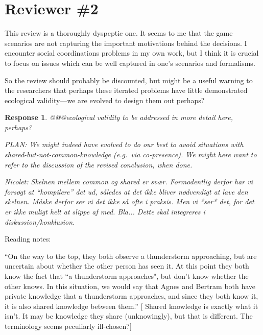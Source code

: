 \documentclass[a4paper]{article}
\newtheorem{response}{Response}
\newenvironment{robin}{\smallskip \noindent \color{red!10!green!50!blue}}{\color{black}\smallskip}
\begin{document}
\section*{Reviewer \#2}
This review is a thoroughly dyspeptic one. It seems to me that the game scenarios are not capturing the important motivations behind the decisions. I encounter social coordinations problems in my own work, but I think it is crucial to focus on issues which can be well captured in one's scenarios and formalisms.

So the review should probably be discounted, but might be a useful warning to the researchers that perhaps these iterated problems have little demonstrated ecological validity---we are evolved to design them out perhaps?

\begin{response}
  @@@ecological validity to be addressed in more detail here, perhaps? 
  
  PLAN: We might indeed have evolved to do our best to avoid situations with shared-but-not-common-knowledge (e.g.\ via co-presence). We might here want to refer to the discussion of the revised conclusion, when done. 
  
  Nicolet: Skelnen mellem common og shared er svær. Formodentlig derfor har vi forsøgt at ``kompilere'' det ud, således at det ikke bliver nødvendigt at lave den skelnen. Måske derfor ser vi det ikke så ofte i praksis. Men vi *ser* det, for det er ikke muligt helt at slippe af med. Bla... Dette skal integreres i diskussion/konklusion.
\end{response}


Reading notes:

``On the way to the top, they both observe a thunderstorm approaching, but are uncertain about whether the other person has seen it. At this point they both know the fact that ``a thunderstorm approaches", but don't know whether the other knows. In this situation, we would say that Agnes and Bertram both have private knowledge that a thunderstorm approaches, and since they both know it, it is also shared knowledge between them.''
[ Shared knowledge is exactly what it isn't. It may be knowledge they share (unknowingly), but that is different. The terminology seems peculiarly ill-chosen?]
\end{document}
